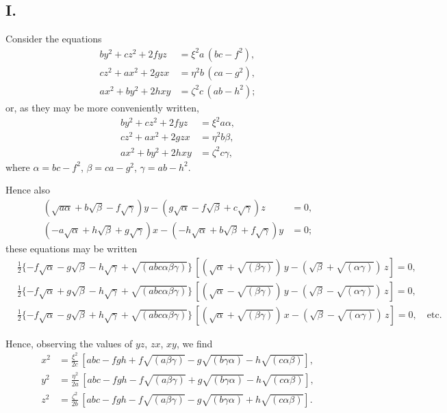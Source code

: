 \documentclass[12pt,a4paper]{article}
\begin{document}
\subsection*{I.}

Consider the equations
\begin{align*}
by^2 + cz^2 + 2fyz &= \xi^2a\,(bc - f^2), \\
cz^2 + ax^2 + 2gzx &= \eta^2b\,(ca - g^2), \\
ax^2 + by^2 + 2hxy &= \zeta^2c\,(ab - h^2);
\end{align*}
or, as they may be more conveniently written,
\begin{align*}
by^2 + cz^2 + 2fyz &= \xi^2a\alpha, \\
cz^2 + ax^2 + 2gzx &= \eta^2b\beta, \\
ax^2 + by^2 + 2hxy &= \zeta^2c\gamma,
\end{align*}
where $\alpha = bc - f^2$, $\beta = ca - g^2$, $\gamma = ab - h^2$.

Hence also
\begin{align*}
(\sqrt{a\alpha} + b\sqrt{\beta} - f\sqrt{\gamma})y - (g\sqrt{\alpha} - f\sqrt{\beta} + c\sqrt{\gamma})z &= 0, \\
(-a\sqrt{\alpha} + h\sqrt{\beta} + g\sqrt{\gamma})x - (-h\sqrt{\alpha} + b\sqrt{\beta} + f\sqrt{\gamma})y &= 0;
\end{align*}
these equations may be written
\begin{align*}
&\tfrac{1}{2}\{-f\sqrt{\alpha} - g\sqrt{\beta} - h\sqrt{\gamma} + \sqrt{(abc\alpha\beta\gamma)}\}\,[(\sqrt{\alpha} + \sqrt{(\beta\gamma)})\,y - (\sqrt{\beta} + \sqrt{(\alpha\gamma)})\,z] = 0, \\
&\tfrac{1}{2}\{-f\sqrt{\alpha} + g\sqrt{\beta} - h\sqrt{\gamma} + \sqrt{(abc\alpha\beta\gamma)}\}\,[(\sqrt{\alpha} - \sqrt{(\beta\gamma)})\,y - (\sqrt{\beta} - \sqrt{(\alpha\gamma)})\,z] = 0, \\
&\tfrac{1}{2}\{-f\sqrt{\alpha} - g\sqrt{\beta} + h\sqrt{\gamma} + \sqrt{(abc\alpha\beta\gamma)}\}\,[(\sqrt{\alpha} + \sqrt{(\beta\gamma)})\,x - (\sqrt{\beta} - \sqrt{(\alpha\gamma)})\,z] = 0, \quad \text{etc.}
\end{align*}

Hence, observing the values of $yz$, $zx$, $xy$, we find
\begin{align*}
x^2 &= \frac{\xi^2}{2c}\,[abc - fgh + f\sqrt{(a\beta\gamma)} - g\sqrt{(b\gamma\alpha)} - h\sqrt{(c\alpha\beta)}], \\
y^2 &= \frac{\eta^2}{2a}\,[abc - fgh - f\sqrt{(a\beta\gamma)} + g\sqrt{(b\gamma\alpha)} - h\sqrt{(c\alpha\beta)}], \\
z^2 &= \frac{\zeta^2}{2b}\,[abc - fgh - f\sqrt{(a\beta\gamma)} - g\sqrt{(b\gamma\alpha)} + h\sqrt{(c\alpha\beta)}].
\end{align*}
\end{document}
